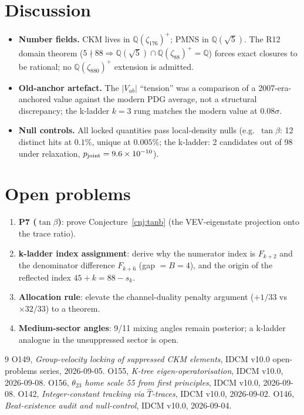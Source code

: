 \documentclass[12pt]{article}
\begin{document}
\section{Discussion}
\label{sec:discussion}
\begin{itemize}
\item \textbf{Number fields.} CKM lives in $\mathbb{Q}(\zeta_{176})^+$;
PMNS in $\mathbb{Q}(\sqrt5)$. The R12 domain theorem
($5\nmid 88 \Rightarrow \mathbb{Q}(\sqrt5)\cap\mathbb{Q}(\zeta_{88})^+
= \mathbb{Q}$) forces exact closures to be rational; no
$\mathbb{Q}(\zeta_{880})^+$ extension is admitted.
\item \textbf{Old-anchor artefact.} The $|V_{ub}|$ ``tension'' was a
comparison of a 2007-era-anchored value against the modern PDG average,
not a structural discrepancy; the k-ladder $k=3$ rung matches the modern
value at $0.08\sigma$.
\item \textbf{Null controls.} All locked quantities pass local-density
nulls (e.g.\ $\tan\beta$: 12 distinct hits at $0.1\%$, unique at
$0.005\%$; the k-ladder: 2 candidates out of 98 under relaxation,
$p_{\rm joint} = 9.6\times10^{-10}$).
\end{itemize}

\section{Open problems}
\label{sec:open}
\begin{enumerate}
\item \textbf{P7 ($\tan\beta$)}: prove Conjecture~\ref{cnj:tanb} (the
VEV-eigenstate projection onto the trace ratio).
\item \textbf{k-ladder index assignment}: derive why the numerator index is
$F_{k+2}$ and the denominator difference $F_{k+6}$ (gap $= B = 4$), and the
origin of the reflected index $45+k = 88-s_k$.
\item \textbf{Allocation rule}: elevate the channel-duality penalty
argument ($+1/33$ vs $\times 32/33$) to a theorem.
\item \textbf{Medium-sector angles}: 9/11 mixing angles remain
posterior; a k-ladder analogue in the unsuppressed sector is open.
\end{enumerate}

\begin{thebibliography}{9}
 O149, \emph{Group-velocity locking of suppressed CKM
elements}, IDCM v10.0 open-problems series, 2026-09-05.
 O155, \emph{K-tree eigen-operatorisation}, IDCM v10.0, 2026-09-08.
 O156, \emph{$\theta_{23}$ home scale 55 from first
principles}, IDCM v10.0, 2026-09-08.
 O142, \emph{Integer-constant tracking via
$\hat T$-traces}, IDCM v10.0, 2026-09-02.
 O146, \emph{Beat-existence audit and null-control},
IDCM v10.0, 2026-09-04.
\end{thebibliography}
\end{document}
